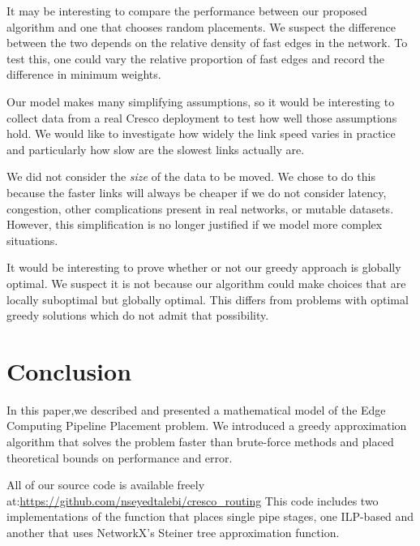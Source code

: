 \documentclass{article}
\begin{document}
 	 It may be interesting to compare the performance between our proposed algorithm and one that chooses random placements. We suspect the difference between the two depends on the relative density of fast edges in the network. To test this, one could vary the relative proportion of fast edges and record the difference in minimum weights.
 	 
 	 Our model makes many simplifying assumptions, so it would be interesting to collect data from a real Cresco deployment to test how well those assumptions hold. We would like to investigate how widely the link speed varies in practice and particularly how slow are the slowest links actually are.
 	 
 	 We did not consider the \textit{size} of the data to be moved. We chose to do this because the faster links will always be cheaper if we do not consider latency, congestion, other complications present in real networks, or mutable datasets. However, this simplification is no longer justified if we model more complex situations.
 	 
 	 It would be interesting to prove whether or not our greedy approach is globally optimal. We suspect it is not because our algorithm could make choices that are locally suboptimal but globally optimal. This differs from problems with optimal greedy solutions which do not admit that possibility.
 	  
 	 \section{Conclusion}
 	 In this paper,we described and presented a mathematical model of the Edge Computing Pipeline Placement problem. We introduced a greedy approximation algorithm that solves the problem faster than brute-force methods and placed theoretical bounds on performance and error.

	All of our source code is available freely at:\url{https://github.com/nseyedtalebi/cresco_routing} This code includes two implementations of the function that places single pipe stages, one ILP-based and another that uses NetworkX's Steiner tree approximation function.	
	
	
	
\end{document}
